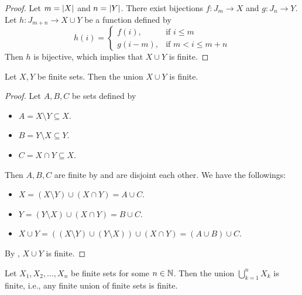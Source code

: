 \begin{proof}
    Let $m = \abs*{X}$ and $n = \abs*{Y}$. There exist bijections $f: J_{m} \to X$ and $g: J_{n} \to Y$.
    Let $h: J_{m + n} \to X \cup Y$ be a function defined by
    \[
    h(i) = \begin{cases}
        f(i), & \text{if } i \leq m \\
        g(i - m), & \text{if } m < i \leq m + n
    \end{cases}
    \]
    Then $h$ is bijective, which implies that $X \cup Y$ is finite.
\end{proof}

\bigskip

\begin{theorem} \label{thm:UnionOfTwoFiniteSetsIsFinite}
    Let $X, Y$ be finite sets. Then the union $X \cup Y$ is finite.
\end{theorem}

\begin{proof}
    Let $A, B, C$ be sets defined by
    \begin{itemize}
        \item $A = X \setminus Y \subseteq X$.
        \item $B = Y \setminus X \subseteq Y$.
        \item $C = X \cap Y \subseteq X$.
    \end{itemize}
    Then $A, B, C$ are finite by  and are disjoint each other. We have the followings:
    \begin{itemize}
        \item $X = (X \setminus Y) \cup (X \cap Y) = A \cup C$.
        \item $Y = (Y \setminus X) \cup (X \cap Y) = B \cup C$.
        \item $X \cup Y = ((X \setminus Y) \cup (Y \setminus X)) \cup (X \cap Y) = (A \cup B) \cup C$.
    \end{itemize}
    By , $X \cup Y$ is finite.
\end{proof}

\bigskip

\begin{theorem} \label{thm:FiniteUnionOfFiniteSetsIsFinite}
    Let $X_{1}, X_{2}, \dots, X_{n}$ be finite sets for some $n \in \N$. Then the union
    $\displaystyle \bigcup_{k = 1}^{n} X_{k}$ is finite, i.e., any finite union of finite sets is finite.
\end{theorem}

